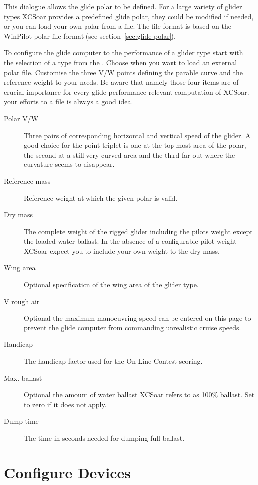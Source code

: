 This dialogue allows the glide polar to be defined. For a large variety of glider
types XCSoar provides a predefined glide polar, they could be modified if 
needed, or you can load your own polar from a file. 
The file format is based on the WinPilot polar file format (see section~\ref{sec:glide-polar}).

\label{conf:polar} To configure the glide computer to the performance of a glider 
type start with the selection of a type from the . 
Choose  when you want to load an external polar file.
Customise the three V/W points defining the parable curve and the reference 
weight to your needs. 
\tip Be aware that namely those four items are of crucial importance 
for every glide performance relevant computation of XCSoar.   
 your efforts to a file is always a good idea.

\begin{description}
\item[Polar V/W]  Three pairs of corresponding horizontal and vertical speed of the glider. 
  A good choice for the point triplet is one at the top most area of the polar, the second at a 
  still very curved area and the third far out where the curvature seems to disappear.
\item[Reference mass]  Reference weight at which the given polar is valid.
\item[Dry mass]  The complete weight of the rigged glider including the pilots weight except the 
  loaded water ballast. 
  In the absence of a configurable pilot weight XCSoar expect you to include your own weight 
  to the dry mass.
\item[Wing area]  Optional specification of the wing area of the glider type.
\item[V rough air] Optional the maximum manoeuvring speed can 
  be entered on this page to prevent the glide computer from commanding 
  unrealistic cruise speeds.
\item[Handicap]  The handicap factor used for the On-Line Contest scoring.
\item[Max. ballast]  Optional the amount of water ballast XCSoar refers to as 100\% ballast.
  Set to zero if it does not apply.
\item[Dump time]  The time in seconds needed for dumping full ballast.
\end{description}


\section{Configure Devices} \label{conf:comdevices}

